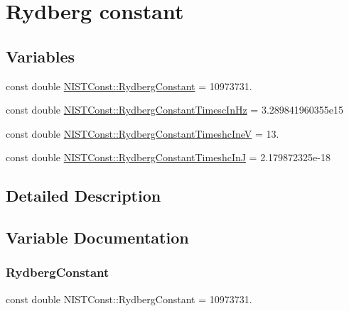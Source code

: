 \hypertarget{group___n_i_s_t_const-_rydberg_constant}{}\section{Rydberg constant}
\label{group___n_i_s_t_const-_rydberg_constant}
\subsection*{Variables}
\begin{DoxyCompactItemize}
\item 
const double \hyperlink{group___n_i_s_t_const-_rydberg_constant_gaa434f78f9fead2fcf2e129a137853e26}{N\+I\+S\+T\+Const\+::\+Rydberg\+Constant} = 10973731.
\item 
const double \hyperlink{group___n_i_s_t_const-_rydberg_constant_ga473e14f2663eccecd987928be1d512ad}{N\+I\+S\+T\+Const\+::\+Rydberg\+Constant\+Timesc\+In\+Hz} = 3.\+289841960355e15
\item 
const double \hyperlink{group___n_i_s_t_const-_rydberg_constant_ga77c7dd314342e7f121d9b8775a45d20f}{N\+I\+S\+T\+Const\+::\+Rydberg\+Constant\+Timeshc\+IneV} = 13.
\item 
const double \hyperlink{group___n_i_s_t_const-_rydberg_constant_gaa4164006d51dbf240eb83065e83bddec}{N\+I\+S\+T\+Const\+::\+Rydberg\+Constant\+Timeshc\+InJ} = 2.\+179872325e-\/18
\end{DoxyCompactItemize}


\subsection{Detailed Description}


\subsection{Variable Documentation}
\mbox{\label{group___n_i_s_t_const-_rydberg_constant_gaa434f78f9fead2fcf2e129a137853e26}} 
\subsubsection{\texorpdfstring{Rydberg\+Constant}{RydbergConstant}}
{\footnotesize\ttfamily const double N\+I\+S\+T\+Const\+::\+Rydberg\+Constant = 10973731.}

